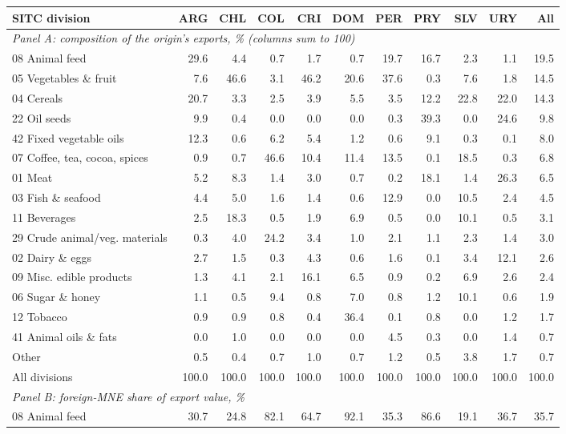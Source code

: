 \begin{tabular}{lrrrrrrrrrr}
\toprule
SITC division & ARG & CHL & COL & CRI & DOM & PER & PRY & SLV & URY & All \\
\midrule
\multicolumn{11}{l}{\textit{Panel A: composition of the origin's exports, \% (columns sum to 100)}} \\
08 Animal feed & 29.6 & 4.4 & 0.7 & 1.7 & 0.7 & 19.7 & 16.7 & 2.3 & 1.1 & 19.5 \\
05 Vegetables \& fruit & 7.6 & 46.6 & 3.1 & 46.2 & 20.6 & 37.6 & 0.3 & 7.6 & 1.8 & 14.5 \\
04 Cereals & 20.7 & 3.3 & 2.5 & 3.9 & 5.5 & 3.5 & 12.2 & 22.8 & 22.0 & 14.3 \\
22 Oil seeds & 9.9 & 0.4 & 0.0 & 0.0 & 0.0 & 0.3 & 39.3 & 0.0 & 24.6 & 9.8 \\
42 Fixed vegetable oils & 12.3 & 0.6 & 6.2 & 5.4 & 1.2 & 0.6 & 9.1 & 0.3 & 0.1 & 8.0 \\
07 Coffee, tea, cocoa, spices & 0.9 & 0.7 & 46.6 & 10.4 & 11.4 & 13.5 & 0.1 & 18.5 & 0.3 & 6.8 \\
01 Meat & 5.2 & 8.3 & 1.4 & 3.0 & 0.7 & 0.2 & 18.1 & 1.4 & 26.3 & 6.5 \\
03 Fish \& seafood & 4.4 & 5.0 & 1.6 & 1.4 & 0.6 & 12.9 & 0.0 & 10.5 & 2.4 & 4.5 \\
11 Beverages & 2.5 & 18.3 & 0.5 & 1.9 & 6.9 & 0.5 & 0.0 & 10.1 & 0.5 & 3.1 \\
29 Crude animal/veg. materials & 0.3 & 4.0 & 24.2 & 3.4 & 1.0 & 2.1 & 1.1 & 2.3 & 1.4 & 3.0 \\
02 Dairy \& eggs & 2.7 & 1.5 & 0.3 & 4.3 & 0.6 & 1.6 & 0.1 & 3.4 & 12.1 & 2.6 \\
09 Misc. edible products & 1.3 & 4.1 & 2.1 & 16.1 & 6.5 & 0.9 & 0.2 & 6.9 & 2.6 & 2.4 \\
06 Sugar \& honey & 1.1 & 0.5 & 9.4 & 0.8 & 7.0 & 0.8 & 1.2 & 10.1 & 0.6 & 1.9 \\
12 Tobacco & 0.9 & 0.9 & 0.8 & 0.4 & 36.4 & 0.1 & 0.8 & 0.0 & 1.2 & 1.7 \\
41 Animal oils \& fats & 0.0 & 1.0 & 0.0 & 0.0 & 0.0 & 4.5 & 0.3 & 0.0 & 1.4 & 0.7 \\
Other & 0.5 & 0.4 & 0.7 & 1.0 & 0.7 & 1.2 & 0.5 & 3.8 & 1.7 & 0.7 \\
All divisions & 100.0 & 100.0 & 100.0 & 100.0 & 100.0 & 100.0 & 100.0 & 100.0 & 100.0 & 100.0 \\
\midrule
\multicolumn{11}{l}{\textit{Panel B: foreign-MNE share of export value, \%}} \\
08 Animal feed & 30.7 & 24.8 & 82.1 & 64.7 & 92.1 & 35.3 & 86.6 & 19.1 & 36.7 & 35.7 \\

\end{tabular}
